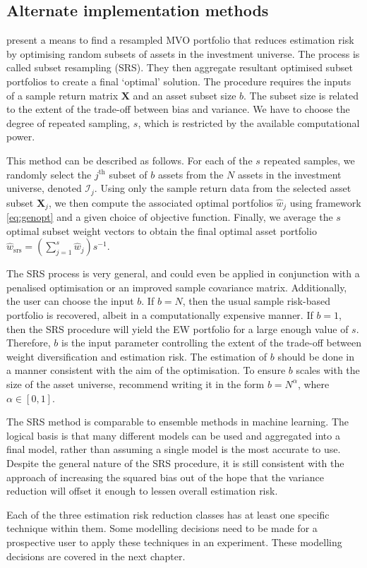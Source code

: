 \documentclass[
]{article}
\begin{document}
\hypertarget{alternate-implementation-methods}{%
\subsection{Alternate implementation methods}\label{alternate-implementation-methods}}

\citet{SW17} present a means to find a resampled MVO portfolio that reduces estimation risk by optimising random subsets of assets in the investment universe. The process is called subset resampling (SRS). They then aggregate resultant optimised subset portfolios to create a final `optimal' solution. The procedure requires the inputs of a sample return matrix \(\textbf{X}\) and an asset subset size \(b\). The subset size is related to the extent of the trade-off between bias and variance. We have to choose the degree of repeated sampling, \(s\), which is restricted by the available computational power.

This method can be described as follows. For each of the \(s\) repeated samples, we randomly select the \(j^{\text{th}}\) subset of \(b\) assets from the \(N\) assets in the investment universe, denoted \(\mathcal{I}_j\). Using only the sample return data from the selected asset subset \(\textbf{X}_j\), we then compute the associated optimal portfolios \(\hat{w}_j\) using framework \eqref{eq:genopt} and a given choice of objective function. Finally, we average the \(s\) optimal subset weight vectors to obtain the final optimal asset portfolio \(\hat{w}_\mathrm{srs} = (\sum_{j = 1}^s \hat{w}_j)s^{-1}\).

The SRS process is very general, and could even be applied in conjunction with a penalised optimisation or an improved sample covariance matrix. Additionally, the user can choose the input \(b\). If \(b = N\), then the usual sample risk-based portfolio is recovered, albeit in a computationally expensive manner. If \(b = 1\), then the SRS procedure will yield the EW portfolio for a large enough value of \(s\). Therefore, \(b\) is the input parameter controlling the extent of the trade-off between weight diversification and estimation risk. The estimation of \(b\) should be done in a manner consistent with the aim of the optimisation. To ensure \(b\) scales with the size of the asset universe, \citet{SW17} recommend writing it in the form \(b = N^{\alpha}\), where \(\alpha \in [0, 1]\).

The SRS method is comparable to ensemble methods in machine learning. The logical basis is that many different models can be used and aggregated into a final model, rather than assuming a single model is the most accurate to use. Despite the general nature of the SRS procedure, it is still consistent with the approach of increasing the squared bias out of the hope that the variance reduction will offset it enough to lessen overall estimation risk.

Each of the three estimation risk reduction classes has at least one specific technique within them. Some modelling decisions need to be made for a prospective user to apply these techniques in an experiment. These modelling decisions are covered in the next chapter.

  
\end{document}
